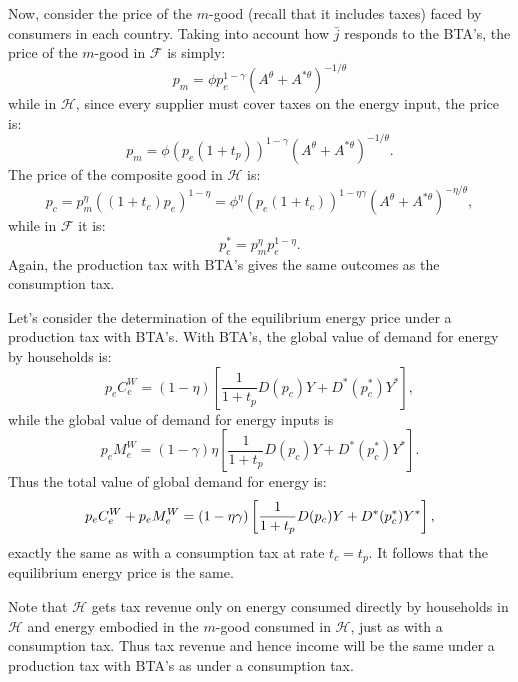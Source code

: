 \documentclass[notitlepage,12pt]{article}
\begin{document}
Now, consider the price of the $m$-good (recall that it includes taxes)
faced by consumers in each country. Taking into account how $\bar{j}$
responds to the BTA's, the price of the $m$-good in $\mathcal{F}$ is simply:%
\begin{equation*}
p_{m}=\phi p_{e}^{1-\gamma }\left( A^{\theta }+A^{\ast \theta }\right)
^{-1/\theta }
\end{equation*}%
while in $\mathcal{H}$, since every supplier must cover taxes on the energy
input, the price is:%
\begin{equation*}
p_{m}=\phi (p_{e}\left( 1+t_{p}\right) )^{1-\gamma }\left( A^{\theta
}+A^{\ast \theta }\right) ^{-1/\theta }.
\end{equation*}%
The price of the composite good in $\mathcal{H}$ is:%
\begin{equation*}
p_{c}=p_{m}^{\eta }\left( \left( 1+t_{c}\right) p_{e}\right) ^{1-\eta }=\phi
^{\eta }(p_{e}\left( 1+t_{c}\right) )^{1-\eta \gamma }\left( A^{\theta
}+A^{\ast \theta }\right) ^{-\eta /\theta },
\end{equation*}%
while in $\mathcal{F}$ it is:%
\begin{equation*}
p_{c}^{\ast }=p_{m}^{\eta }p_{e}^{1-\eta }.
\end{equation*}%
Again, the production tax with BTA's gives the same outcomes as the
consumption tax.

Let's consider the determination of the equilibrium energy price under a
production tax with BTA's. With BTA's, the global value of demand for energy
by households is:%
\begin{equation*}
p_{e}C_{e}^{W}=\left( 1-\eta \right) \left[ \frac{1}{1+t_{p}}%
D(p_{c})Y+D^{\ast }(p_{c}^{\ast })Y^{\ast }\right] ,
\end{equation*}%
while the global value of demand for energy inputs is%
\begin{equation*}
p_{e}M_{e}^{W}=\left( 1-\gamma \right) \eta \left[ \frac{1}{1+t_{p}}%
D(p_{c})Y+D^{\ast }(p_{c}^{\ast })Y^{\ast }\right] .
\end{equation*}%
Thus the total value of global demand for energy is:%
\begin{equation*}
p_{e}C_{e}^{W}+p_{e}M_{e}^{W}=\left( 1-\eta \gamma \right) \left[ \frac{1}{%
1+t_{p}}D(p_{c})Y+D^{\ast }(p_{c}^{\ast })Y^{\ast }\right] ,
\end{equation*}%
exactly the same as with a consumption tax at rate $t_{c}=t_{p}$. It follows
that the equilibrium energy price is the same.

Note that $\mathcal{H}$ gets tax revenue only on energy consumed directly by
households in $\mathcal{H}$ and energy embodied in the $m$-good consumed in $%
\mathcal{H}$, just as with a consumption tax. Thus tax revenue and hence
income will be the same under a production tax with BTA's as under a
consumption tax.
\end{document}
